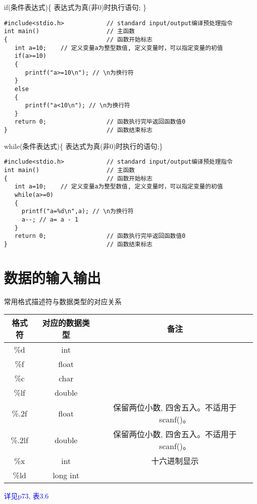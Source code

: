 \begin{frame}[fragile]{if(条件表达式)\{ 表达式为真(非0)时执行语句; \}}
\begin{lstlisting}
#include<stdio.h>            // standard input/output编译预处理指令
int main()                   // 主函数
{                            // 函数开始标志
   int a=10;    // 定义变量a为整型数值, 定义变量时，可以指定变量的初值
   if(a>=10)
   {
      printf("a>=10\n"); // \n为换行符
   }
   else
   {
      printf("a<10\n"); // \n为换行符
   }
   return 0;                 // 函数执行完毕返回函数值0
}                            // 函数结束标志
\end{lstlisting}
\end{frame}

\begin{frame}[fragile]{while(条件表达式)\{ 表达式为真(非0)时执行的语句;\}}
\begin{lstlisting}
#include<stdio.h>            // standard input/output编译预处理指令
int main()                   // 主函数
{                            // 函数开始标志
   int a=10;    // 定义变量a为整型数值, 定义变量时，可以指定变量的初值
   while(a>=0)
   {
     printf("a=%d\n",a); // \n为换行符
     a--; // a= a - 1
   }
   return 0;                 // 函数执行完毕返回函数值0
}                            // 函数结束标志
\end{lstlisting}
\end{frame}

\section{数据的输入输出}

\begin{frame}{常用格式描述符与数据类型的对应关系}
\begin{tabular}{|c|c|c|}
	\hline 
	\textbf{格式符} & \textbf{对应的数据类型} &  \textbf{备注}\\ 
	\hline 
	\%d & int &  \\ 
	\hline  
	\%f & float &  \\
	\hline
	\%c & char & \\ 
	\hline   
	\%lf & double & \\ 
	\hline 
	\%.2f & float & 保留两位小数, 四舍五入。不适用于scanf()。 \\ 
	\hline 
	\%.2lf & double & 保留两位小数, 四舍五入。不适用于scanf()。 \\ 
	\hline
	\hline   
	\%x & int & 十六进制显示 \\ 
	\hline 
	\%ld & long int &  \\ 
	\hline 
\end{tabular}
\newline
\newline
\textcolor{blue}{详见p73, 表3.6}
\end{frame}


